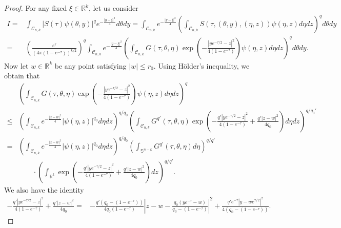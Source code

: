 \documentclass[11pt]{amsart}
\numberwithin{equation}{section}
\numberwithin{equation}{section}
\newcommand{\bS}{\mathbb{S}}
\newcommand{\cC}{\mathcal{C}}
\newcommand{\R}{\mathbb{R}}
\begin{document}
	\begin{proof}
		For any fixed $\xi\in\R^k$, let us consider
		\[
		\begin{split}
			I
			=&
			\int_{\cC_{n,k}}
			|S(\tau)\psi(\theta,y)|^q e^{-\frac{|y-\xi|^2}{4}}d\theta dy
			=
			\int_{\cC_{n,k}}
			e^{-\frac{|y-\xi|^2}{4}}
			\left(
			\int_{\cC_{n,k}} S(\tau,(\theta,y),(\eta,z))\psi(\eta,z)d\eta dz
			\right)^q d\theta dy
			\\
			=&
			\left(\frac{e^\tau}{(4\pi(1-e^{-\tau}))^{k/2}}\right)^q
			\int_{\cC_{n,k}}
			e^{-\frac{|y-\xi|^2}{4}}
			\left(
			\int_{\cC_{n,k}} G(\tau,\theta,\eta)
			\exp\left(-\frac{|ye^{-\tau/2}-z|^2}{4(1-e^{-\tau})}\right)
			\psi(\eta,z)d\eta dz
			\right)^q d\theta dy	.
		\end{split}
		\]
		Now let $w\in\R^k$ be any point satisfying $|w|\leq r_0$. Using H\"older's inequality, we obtain that 
		\[
		\begin{split}
			&
			\left(
			\int_{\cC_{n,k}} G(\tau,\theta,\eta)
			\exp\left(-\frac{|ye^{-\tau/2}-z|^2}{4(1-e^{-\tau})}\right)
			\psi(\eta,z)d\eta dz
			\right)^q
			\\
			\leq &
			\left(
			\int_{\cC_{n,k}} 
			e^{-\frac{|z-w|^2}{4}}
			|\psi(\eta,z)|^{q_0} d\eta dz
			\right)^{q/q_0}
			\left(
			\int_{\cC_{n,k}} G^{q'}(\tau,\theta,\eta)
			\exp\left(-\frac{q'|ye^{-\tau/2}-z|^2}{4(1-e^{-\tau})}+\frac{q'|z-w|^2}{4q_0}\right)d\eta dz
			\right)^{q/q_0'}
			\\
			=&
			\left(
			\int_{\cC_{n,k}} 
			e^{-\frac{|z-w|^2}{4}}
			|\psi(\eta,z)|^{q_0} d\eta dz
			\right)^{q/q_0}
			\left(
			\int_{\bS^{n-k}} G^{q'}(\tau,\theta,\eta)
			d\eta
			\right)^{q/q'}
			\\
			&\qquad \cdot
			\left(
			\int_{\R^k} 
			\exp\left(-\frac{q'|ye^{-\tau/2}-z|^2}{4(1-e^{-\tau})}+\frac{q'|z-w|^2}{4q_0}\right) dz
			\right)^{q/q'}.
		\end{split}
		\]
		We also have the identity
		\[
		\begin{split}
			-\frac{q'|ye^{-\tau/2}-z|^2}{4(1-e^{-\tau})}+\frac{q'|z-w|^2}{4q_0}
			=&
			-\frac{q'(q_0-(1-e^{-\tau}))}{4q_0(1-e^{-\tau})}
			\left|
			z-w-\frac{q_0 (ye^{-\tau}-w)}{q_0-(1-e^{-\tau})}
			\right|^2
			+\frac{q'e^{-\tau}|y-w e^{\tau/2}|^2}{4(q_0-(1-e^{-\tau}))}.
		\end{split}
		\]
		

\end{proof}
\end{document}
